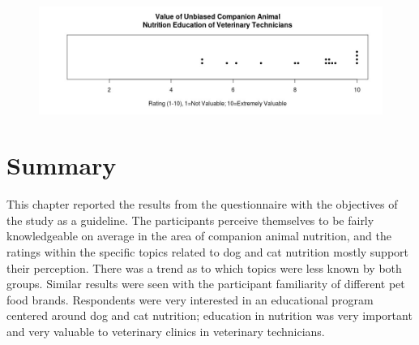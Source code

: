    \begin{figure}[htbp] 
    \centering
    \textbf{}\par\medskip
    \includegraphics[width=1.0\textwidth]{Images/voucane.jpeg}
    \label{mgraph11}
    \end{figure}
\section{Summary}
This chapter reported the results from the questionnaire with the objectives of the study as a guideline. The participants perceive themselves to be fairly knowledgeable on average in the area of companion animal nutrition, and the ratings within the specific topics related to dog and cat nutrition mostly support their perception. There was a trend as to which topics were less known by both groups. Similar results were seen with the participant familiarity of different pet food brands. Respondents were very interested in an educational program centered around dog and cat nutrition; education in nutrition was very important and very valuable to veterinary clinics in veterinary technicians.
